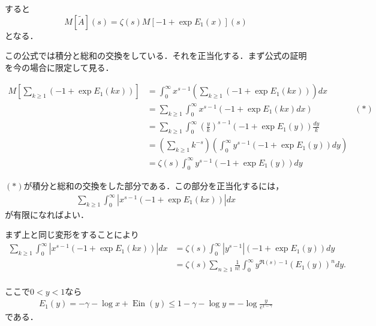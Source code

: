 \documentclass{jsarticle}
\newcommand{\Ein}{\operatorname{Ein}}
\theoremstyle{definition}
\begin{document}
すると
\[ M[\tilde{A}](s) = \zeta(s) M\left[ -1 + \exp E_1(x) \right](s) \]
となる．

この公式では積分と総和の交換をしている．それを正当化する．まず公式の証明を今の場合に限定して見る．

\begin{align*}
M\left[\sum_{k \ge 1} \left(-1 + \exp E_1(k x) \right)\right]
&= \int_0^\infty x^{s-1} \left(\sum_{k \ge 1} \left(-1 + \exp E_1(k x) \right)\right) dx \\
&= \sum_{k \ge 1} \int_0^\infty x^{s-1} \left(-1 + \exp E_1(k x) dx \right)  & (\ast) \\
&=  \sum_{k \ge 1} \int_0^\infty \left(\frac{y}{k}\right)^{s-1} \left(-1 + \exp E_1(y) \right) \frac{dy}{k} \\
&=  \left(\sum_{k \ge 1} k^{-s}\right) \left(\int_0^\infty y^{s-1} \left(-1 + \exp E_1(y) \right) dy\right) \\
&= \zeta(s) \int_0^\infty y^{s-1} \left(-1 + \exp E_1(y) \right) dy
\end{align*}

$(\ast)$が積分と総和の交換をした部分である．この部分を正当化するには，
\begin{align*}
\sum_{k \ge 1} \int_0^\infty \left|x^{s-1} \left(-1 + \exp E_1(k x) \right)\right| dx
\end{align*}
が有限になればよい．

まず上と同じ変形をすることにより
\begin{align*}
\sum_{k \ge 1} \int_0^\infty \left|x^{s-1} \left(-1 + \exp E_1(k x) \right)\right| dx
&= \zeta(s) \int_0^\infty |y^{s-1}| \left(-1 + \exp E_1(y) \right) dy \\
&= \zeta(s) \sum_{n \ge 1} \frac{1}{n!} \int_0^\infty y^{\Re(s)-1} \left(E_1(y)\right)^n dy. \\
\end{align*}

ここで$0 < y < 1$なら
\begin{align*}
E_1(y) = -\gamma-\log x+\Ein(y) \le 1-\gamma-\log y = -\log \frac{y}{e^{1-\gamma}}
\end{align*}
である．
\end{document}
